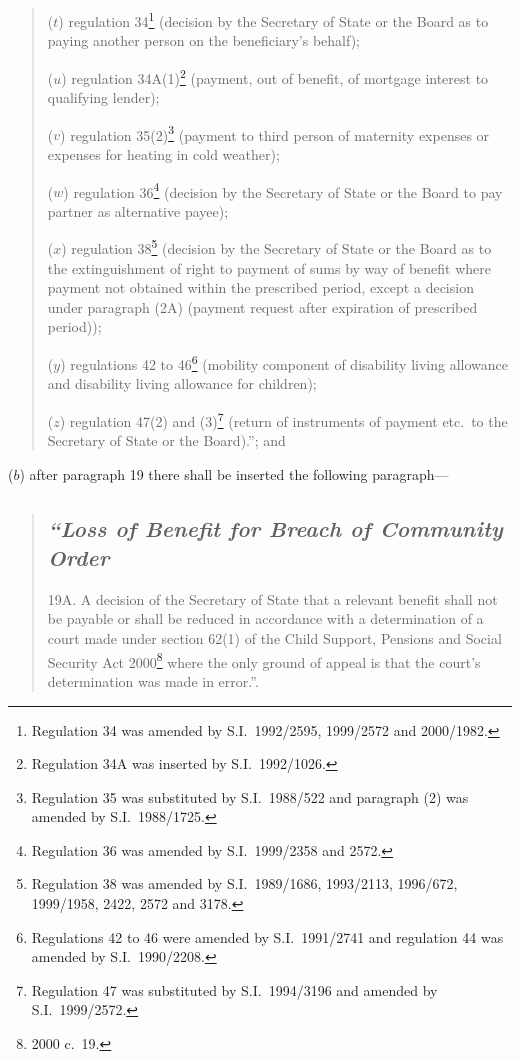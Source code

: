 \documentclass[12pt,a4paper]{article}
\begin{document}
\begin{enumerate}
\begin{quotation}
\begin{enumerate}
($t$) regulation 34\footnote{Regulation 34 was amended by S.I.\ 1992/2595, 1999/2572 and 2000/1982.} (decision by the Secretary of State or the Board as to paying another person on the beneficiary’s behalf);

($u$) regulation 34A(1)\footnote{Regulation 34A was inserted by S.I.\ 1992/1026.} (payment, out of benefit, of mortgage interest to qualifying lender);

($v$) regulation 35(2)\footnote{Regulation 35 was substituted by S.I.\ 1988/522 and paragraph (2) was amended by S.I.\ 1988/1725.} (payment to third person of maternity expenses or expenses for heating in cold weather);

($w$) regulation 36\footnote{Regulation 36 was amended by S.I.\ 1999/2358 and 2572.} (decision by the Secretary of State or the Board to pay partner as alternative payee);

($x$) regulation 38\footnote{Regulation 38 was amended by S.I.\ 1989/1686, 1993/2113, 1996/672, 1999/1958, 2422, 2572 and 3178.} (decision by the Secretary of State or the Board as to the extinguishment of right to payment of sums by way of benefit where payment not obtained within the prescribed period, except a decision under paragraph (2A) (payment request after expiration of prescribed period));

($y$) regulations 42 to 46\footnote{Regulations 42 to 46 were amended by S.I.\ 1991/2741 and regulation 44 was amended by S.I.\ 1990/2208.} (mobility component of disability living allowance and disability living allowance for children);

($z$) regulation 47(2) and (3)\footnote{Regulation 47 was substituted by S.I.\ 1994/3196 and amended by S.I.\ 1999/2572.} (return of instruments of payment etc.\ to the Secretary of State or the Board).”; and
\end{enumerate}
\end{quotation}

($b$) after paragraph 19 there shall be inserted the following paragraph—
\begin{quotation}
\subsection*{\itshape “Loss of Benefit for Breach of Community Order}

19A.  A decision of the Secretary of State that a relevant benefit shall not be payable or shall be reduced in accordance with a determination of a court made under section 62(1) of the Child Support, Pensions and Social Security Act 2000\footnote{2000 c.\ 19.} where the only ground of appeal is that the court’s determination was made in error.”.
\end{quotation}
\end{enumerate}
\end{document}
